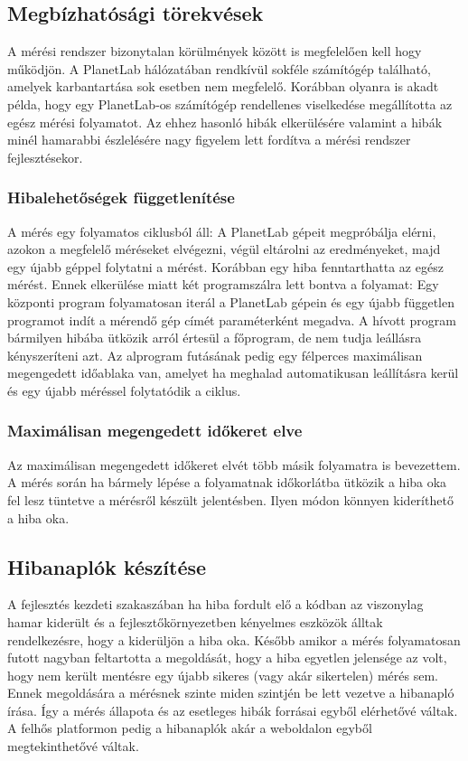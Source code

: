 

\subsection{Megbízhatósági törekvések}
A mérési rendszer bizonytalan körülmények között is megfelelően kell hogy működjön. A PlanetLab hálózatában rendkívül sokféle számítógép található, amelyek karbantartása sok esetben nem megfelelő. Korábban olyanra is akadt példa, hogy egy PlanetLab-os számítógép rendellenes viselkedése megállította az egész mérési folyamatot. Az ehhez hasonló hibák elkerülésére valamint a hibák minél hamarabbi észlelésére nagy figyelem lett fordítva a mérési rendszer fejlesztésekor.

\subsubsection*{Hibalehetőségek függetlenítése}
A mérés egy folyamatos ciklusból áll: A PlanetLab gépeit megpróbálja elérni, azokon a megfelelő méréseket elvégezni, végül eltárolni az eredményeket, majd egy újabb géppel folytatni a mérést.
Korábban egy hiba fenntarthatta az egész mérést. Ennek elkerülése miatt két programszálra lett bontva a folyamat: Egy központi program folyamatosan iterál a PlanetLab gépein és egy újabb független programot indít a mérendő gép címét paraméterként megadva. A hívott program bármilyen hibába ütközik arról értesül a főprogram, de nem tudja leállásra kényszeríteni azt. Az alprogram futásának pedig egy félperces maximálisan megengedett időablaka van, amelyet ha meghalad automatikusan leállításra kerül és egy újabb méréssel folytatódik a ciklus.

\subsubsection*{Maximálisan megengedett időkeret elve}
Az maximálisan megengedett időkeret elvét több másik folyamatra is bevezettem. A mérés során ha bármely lépése a folyamatnak időkorlátba ütközik a hiba oka fel lesz tüntetve a mérésről készült jelentésben. Ilyen módon könnyen kideríthető a hiba oka.

\subsection*{Hibanaplók készítése}
A fejlesztés kezdeti szakaszában ha hiba fordult elő a kódban az viszonylag hamar kiderült és a fejlesztőkörnyezetben kényelmes eszközök álltak rendelkezésre, hogy a kiderüljön a hiba oka. Később amikor a mérés folyamatosan futott nagyban feltartotta a megoldását, hogy a hiba egyetlen jelensége az volt, hogy nem került mentésre egy újabb sikeres (vagy akár sikertelen) mérés sem. Ennek megoldására a mérésnek szinte miden szintjén be lett vezetve a hibanapló írása. Így a mérés állapota és az esetleges hibák forrásai egyből elérhetővé váltak. A felhős platformon pedig a hibanaplók akár a weboldalon egyből megtekinthetővé váltak.

